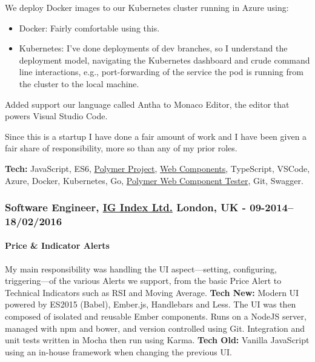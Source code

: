 \documentclass[
  a4paper,
]{article}
\providecommand{\tightlist}{%
  \setlength{\itemsep}{0pt}\setlength{\parskip}{0pt}}
\begin{document}
\begin{multicols*}{2}
We deploy Docker images to our Kubernetes cluster running in Azure
using:

\begin{itemize}
\tightlist
\item
  Docker: Fairly comfortable using this.
\item
  Kubernetes: I've done deployments of dev branches, so I understand the
  deployment model, navigating the Kubernetes dashboard and crude
  command line interactions, e.g., port-forwarding of the service the
  pod is running from the cluster to the local machine.
\end{itemize}

Added support our language called Antha to Monaco Editor, the editor
that powers Visual Studio Code.

Since this is a startup I have done a fair amount of work and I have
been given a fair share of responsibility, more so than any of my prior
roles.

\textbf{Tech:} JavaScript, ES6,
\href{https://www.polymer-project.org}{Polymer Project},
\href{https://www.webcomponents.org}{Web Components}, TypeScript,
VSCode, Azure, Docker, Kubernetes, Go,
\href{https://github.com/Polymer/web-component-tester}{Polymer Web
Component Tester}, Git, Swagger.

\hypertarget{software-engineer-ig-index-ltd.-london-uk---09-201418022016}{%
\subsubsection{\texorpdfstring{Software Engineer,
\href{https://www.ig.com/uk}{IG Index Ltd.} London, UK -
09-2014--18/02/2016}{Software Engineer, IG Index Ltd. London, UK - 09-2014--18/02/2016}}\label{software-engineer-ig-index-ltd.-london-uk---09-201418022016}}

\hypertarget{price-indicator-alerts}{%
\paragraph{Price \& Indicator Alerts}\label{price-indicator-alerts}}

My main responsibility was handling the UI aspect---setting,
configuring, triggering---of the various Alerts we support, from the
basic Price Alert to Technical Indicators such as RSI and Moving
Average. \textbf{Tech New:} Modern UI powered by ES2015 (Babel),
Ember.js, Handlebars and Less. The UI was then composed of isolated and
reusable Ember components. Runs on a NodeJS server, managed with npm and
bower, and version controlled using Git. Integration and unit tests
written in Mocha then run using Karma. \textbf{Tech Old:} Vanilla
JavaScript using an in-house framework when changing the previous UI.


\end{multicols*}
\end{document}
